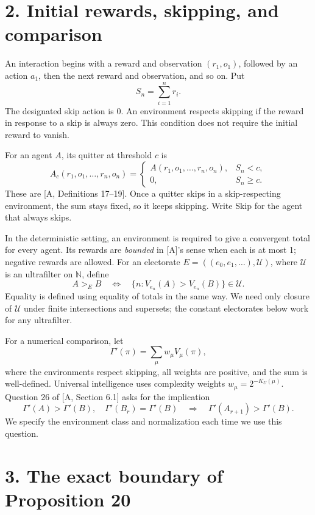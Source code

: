 \documentclass[
  11pt,
  letterpaper,
]{article}
\begin{document}
\section{2. Initial rewards, skipping, and
comparison}\label{initial-rewards-skipping-and-comparison}

An interaction begins with a reward and observation \((r_1,o_1)\),
followed by an action \(a_1\), then the next reward and observation, and
so on. Put \[
                              S_n=\sum_{i=1}^n r_i.
\] The designated skip action is 0. An environment respects skipping if
the reward in response to a skip is always zero. This condition does not
require the initial reward to vanish.

For an agent \(A\), its quitter at threshold \(c\) is \[
 A_c(r_1,o_1,\ldots,r_n,o_n)=
 \begin{cases}
 A(r_1,o_1,\ldots,r_n,o_n),&S_n<c,\\
 0,&S_n\geq c.
 \end{cases}
\] These are {[}A, Definitions 17--19{]}. Once a quitter skips in a
skip-respecting environment, the sum stays fixed, so it keeps skipping.
Write Skip for the agent that always skips.

In the deterministic setting, an environment is required to give a
convergent total for every agent. Its rewards are \emph{bounded} in
{[}A{]}'s sense when each is at most 1; negative rewards are allowed.
For an electorate \(E=((e_0,e_1,\ldots),\mathcal U)\), where
\(\mathcal U\) is an ultrafilter on \(\mathbb N\), define \[
 A>_E B\quad\Longleftrightarrow\quad
                  \{n:V_{e_n}(A)>V_{e_n}(B)\}\in\mathcal U.
\] Equality is defined using equality of totals in the same way. We need
only closure of \(\mathcal U\) under finite intersections and supersets;
the constant electorates below work for any ultrafilter.

For a numerical comparison, let \[
                         \Gamma'(\pi)=\sum_{\mu}w_\mu V_\mu(\pi),
\] where the environments respect skipping, all weights are positive,
and the sum is well-defined. Universal intelligence uses complexity
weights \(w_\mu=2^{-K_U(\mu)}\). Question 26 of {[}A, Section 6.1{]}
asks for the implication \[
 \Gamma'(A)>\Gamma'(B),\quad
 \Gamma'(B_r)=\Gamma'(B)
       \quad\Longrightarrow\quad
 \Gamma'(A_{r+1})>\Gamma'(B).                         \tag{Q}
\] We specify the environment class and normalization each time we use
this question.

\section{3. The exact boundary of Proposition
20}\label{the-exact-boundary-of-proposition-20}
\end{document}
